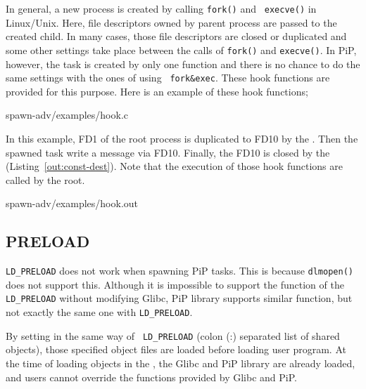 In general, a new process is created by calling {\tt fork()} and {\tt
execve()} in Linux/Unix. Here, file descriptors owned by
parent process are passed to the created child. In many cases, those
file descriptors are closed or duplicated and some other settings take
place between the calls of {\tt fork()} and {\tt execve()}. In PiP,
however, the task is created by only one function and there is no
chance to do the same settings with the ones of using {\tt
  fork\&exec}. These hook functions are provided for this purpose. Here 
is an example of these hook functions;  

 {spawn-adv/examples/hook.c}

In this example, FD1 of the root process is duplicated to FD10 by the
. Then the spawned task write a message via
FD10. Finally, the FD10 is closed by the 
(Listing~\ref{out:const-dest}). 
Note that the execution of those hook functions are called by the root. 


                {spawn-adv/examples/hook.out}

\subsection{PRELOAD}

{\tt LD_PRELOAD} does not work when spawning PiP tasks. This is
because {\tt dlmopen()} does not support this. Although it is
impossible to support the function of the {\tt LD_PRELOAD} without
modifying Glibc, PiP library supports similar function, but not
exactly the same one with  {\tt LD_PRELOAD}.

By setting  in the same way of {\tt
  LD_PRELOAD} (colon (:) separated list of shared objects), those
specified object files are loaded before loading user program. At the
time of loading objects in the , the Glibc and
PiP library are already loaded, and users cannot override the
functions provided by Glibc and PiP.  

